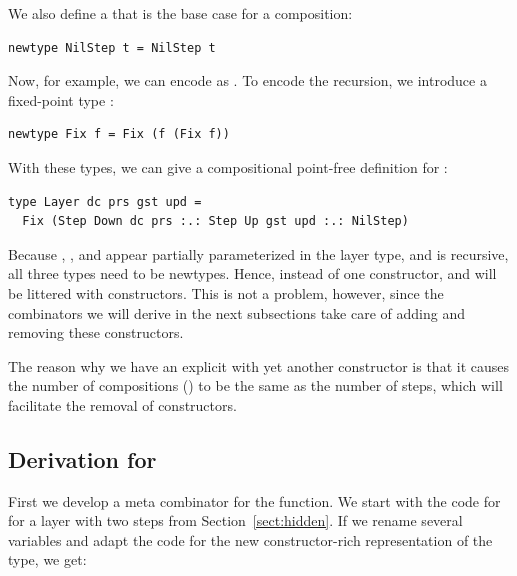 \documentclass[preprint,natbib]{sigplanconf}
\begin{document}
We also define a  that is the base case for a composition:

\begin{small}
\begin{verbatim}
newtype NilStep t = NilStep t
\end{verbatim}
\end{small}

Now, for example, we can encode  as
. To encode the recursion, we introduce a fixed-point type :

\begin{small}
\begin{verbatim}
newtype Fix f = Fix (f (Fix f))
\end{verbatim}
\end{small}

With these types, we can give a compositional point-free definition for :

\begin{small}
\begin{verbatim}
type Layer dc prs gst upd = 
  Fix (Step Down dc prs :.: Step Up gst upd :.: NilStep)
\end{verbatim}
\end{small}

Because , , and   appear partially parameterized in the layer type, and  is recursive, all three types need to be newtypes. Hence, instead of one  constructor,  and  will be littered with constructors. This is not a problem, however, since the combinators we will derive in the next subsections take care of adding and removing these constructors.

The reason why we have an explicit  with yet another constructor is that it causes the number of compositions () to be the same as the number of steps, which will facilitate the removal of  constructors.


%																
\subsection{Derivation for }\label{subsect:liftDerivation}

First we develop a meta combinator for the  function. We start with the code for  for a layer with two steps from Section~\ref{sect:hidden}. If we rename several variables and adapt the code for the new constructor-rich representation of the  type, we get:
\end{document}
